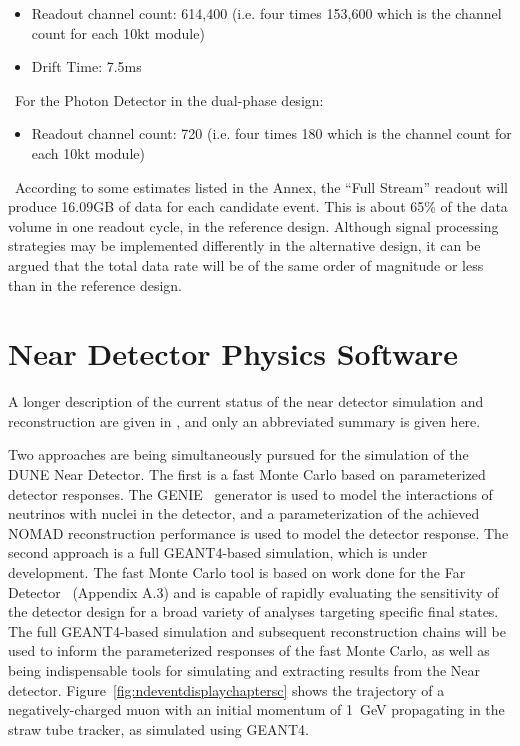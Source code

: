 \begin{itemize}
	\item Readout channel count: 614,400 (i.e. four times 153,600 which is the channel count
	for each 10kt module)
	\item Drift Time: 7.5ms
\end{itemize}
\
For the Photon Detector in the dual-phase design:
\begin{itemize}
	\item Readout channel count: 720 (i.e. four times 180 which is the channel count
	for each 10kt module)
\end{itemize}
\ According to some estimates listed in the Annex, the ``Full Stream''
readout will produce 16.09GB of data for each candidate event. This is
about 65\% of the data volume in one readout cycle, in the reference
design.  Although signal processing strategies may be implemented
differently in the alternative design, it can be argued that the total
data rate will be of the same order of magnitude or less than in the
reference design.

\section{Near Detector Physics Software}
\label{sec:detectors-sc-nd-physics-software}

A longer description of the current status of the near detector simulation and reconstruction are given
in \anxreco, and only an abbreviated summary is given here.

Two approaches are being simultaneously pursued for the simulation of
the DUNE Near Detector.  The first is a fast Monte Carlo based on
parameterized detector responses. The GENIE~\cite{GENIE} generator is
used to model the interactions of neutrinos with nuclei in the
detector, and a parameterization of the achieved NOMAD reconstruction
performance is used to model the detector response.  The second
approach is a full GEANT4-based simulation, which is under
development.  The fast Monte Carlo tool is based on work done for the
Far Detector~\cite{Adams:2013qkq} (Appendix A.3) and is capable of
rapidly evaluating the sensitivity of the detector design for a broad
variety of analyses targeting specific final states.  The full
GEANT4-based simulation and subsequent reconstruction chains will be
used to inform the parameterized responses of the fast Monte Carlo, as
well as being indispensable tools for simulating and extracting
results from the Near detector.
Figure~\ref{fig:ndeventdisplaychaptersc} shows the trajectory of a
negatively-charged muon with an initial momentum of 1~GeV propagating
in the straw tube tracker, as simulated using GEANT4.

